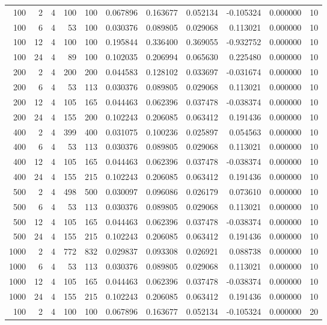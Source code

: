 \begin{table}
\begin{tabular}{rrrrrrrrrrr}
100 & 2 & 4 & 100 & 100 & 0.067896 & 0.163677 & 0.052134 & -0.105324 & 0.000000 & 10 \\
100 & 6 & 4 & 53 & 100 & 0.030376 & 0.089805 & 0.029068 & 0.113021 & 0.000000 & 10 \\
100 & 12 & 4 & 100 & 100 & 0.195844 & 0.336400 & 0.369055 & -0.932752 & 0.000000 & 10 \\
100 & 24 & 4 & 89 & 100 & 0.102035 & 0.206994 & 0.065630 & 0.225480 & 0.000000 & 10 \\
200 & 2 & 4 & 200 & 200 & 0.044583 & 0.128102 & 0.033697 & -0.031674 & 0.000000 & 10 \\
200 & 6 & 4 & 53 & 113 & 0.030376 & 0.089805 & 0.029068 & 0.113021 & 0.000000 & 10 \\
200 & 12 & 4 & 105 & 165 & 0.044463 & 0.062396 & 0.037478 & -0.038374 & 0.000000 & 10 \\
200 & 24 & 4 & 155 & 200 & 0.102243 & 0.206085 & 0.063412 & 0.191436 & 0.000000 & 10 \\
400 & 2 & 4 & 399 & 400 & 0.031075 & 0.100236 & 0.025897 & 0.054563 & 0.000000 & 10 \\
400 & 6 & 4 & 53 & 113 & 0.030376 & 0.089805 & 0.029068 & 0.113021 & 0.000000 & 10 \\
400 & 12 & 4 & 105 & 165 & 0.044463 & 0.062396 & 0.037478 & -0.038374 & 0.000000 & 10 \\
400 & 24 & 4 & 155 & 215 & 0.102243 & 0.206085 & 0.063412 & 0.191436 & 0.000000 & 10 \\
500 & 2 & 4 & 498 & 500 & 0.030097 & 0.096086 & 0.026179 & 0.073610 & 0.000000 & 10 \\
500 & 6 & 4 & 53 & 113 & 0.030376 & 0.089805 & 0.029068 & 0.113021 & 0.000000 & 10 \\
500 & 12 & 4 & 105 & 165 & 0.044463 & 0.062396 & 0.037478 & -0.038374 & 0.000000 & 10 \\
500 & 24 & 4 & 155 & 215 & 0.102243 & 0.206085 & 0.063412 & 0.191436 & 0.000000 & 10 \\
1000 & 2 & 4 & 772 & 832 & 0.029837 & 0.093308 & 0.026921 & 0.088738 & 0.000000 & 10 \\
1000 & 6 & 4 & 53 & 113 & 0.030376 & 0.089805 & 0.029068 & 0.113021 & 0.000000 & 10 \\
1000 & 12 & 4 & 105 & 165 & 0.044463 & 0.062396 & 0.037478 & -0.038374 & 0.000000 & 10 \\
1000 & 24 & 4 & 155 & 215 & 0.102243 & 0.206085 & 0.063412 & 0.191436 & 0.000000 & 10 \\
100 & 2 & 4 & 100 & 100 & 0.067896 & 0.163677 & 0.052134 & -0.105324 & 0.000000 & 20 \\

\end{tabular}
\end{table}
